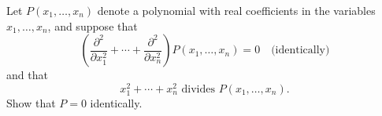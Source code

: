 Let $P(x_1,\dots,x_n)$ denote a polynomial with real coefficients in the
variables $x_1, \dots, x_n$, and suppose that
\[
\left( \frac{\partial^2}{\partial x_1^2} + \cdots + \frac{\partial^2}{\partial
x_n^2}\right) P(x_1, \dots,x_n) = 0 \quad \mbox{(identically)}
\] %
and that
\[
x_1^2 + \cdots + x_n^2 \mbox{ divides } P(x_1, \dots, x_n).
\] %
Show that $P=0$ identically.
